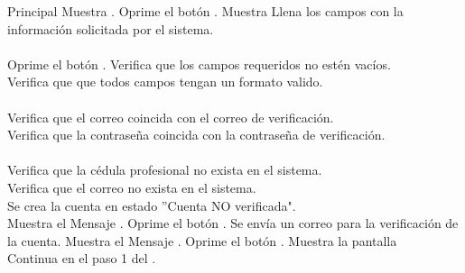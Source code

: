 \begin{UCtrayectoria}{Principal}
    \UCpaso Muestra .
    \UCpaso[\UCactor] Oprime el botón .
    \UCpaso Muestra 
	\UCpaso[\UCactor] Llena los campos con la información solicitada por el sistema.
	\\
	\\
	\UCpaso[\UCactor] Oprime el botón .  \label{CU1Regresa}
	\UCpaso Verifica que los campos requeridos no estén vacíos.
	    \\
	\UCpaso Verifica que que todos campos tengan un formato valido.
	    \\
	    \\
	\UCpaso Verifica que el correo coincida con el correo de verificación.
	    \\
	\UCpaso Verifica que la contraseña coincida con la contraseña de verificación.\\ 
	    \\
	\UCpaso Verifica que la cédula profesional no exista en el sistema.
	    \\
	\UCpaso Verifica que el correo no exista en el sistema.
	    \\
	\UCpaso Se crea la cuenta en estado ''Cuenta NO verificada".
	    \\ 
	\UCpaso Muestra el Mensaje \textbf{}.
    \UCpaso[\UCactor] Oprime el botón .
    \UCpaso Se envía un correo para la verificación de la cuenta.
	\UCpaso Muestra el Mensaje \textbf{}.
    \UCpaso[\UCactor] Oprime el botón .
	\UCpaso Muestra la pantalla \\
	\UCpaso Continua en el paso 1 del .
\end{UCtrayectoria}


